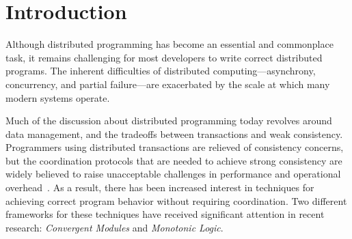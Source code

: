 \section{Introduction}
\label{sec:intro}
Although distributed programming has become an essential and commonplace task,
it remains challenging for most developers to write correct distributed
programs. The inherent difficulties of distributed computing---asynchrony,
concurrency, and partial failure---are exacerbated by the scale at which many
modern systems operate.


Much of the discussion about distributed programming today revolves around data
management, and the tradeoffs between transactions and weak
consistency. Programmers using distributed transactions are relieved of
consistency concerns, but the coordination protocols that are needed to achieve
strong consistency are widely believed to raise unacceptable challenges in
performance and operational overhead~\cite{Birman2009,Helland2009}. As a result,
there has been increased interest in techniques for achieving correct program
behavior without requiring coordination.  Two different frameworks for these
techniques have received significant attention in recent research:
\emph{Convergent Modules} and \emph{Monotonic Logic}.


